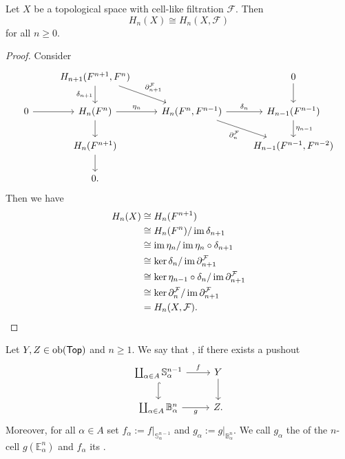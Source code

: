 \begin{theorem}
	Let $X$ be a topological space with cell-like filtration $\mathcal{F}$. Then
	\begin{equation*}
		H_n(X) \cong H_n(X,\mathcal{F})
	\end{equation*}
	\noindent for all $n \geq 0$.
\end{theorem}

\begin{proof}
	Consider
	\begin{equation*}
		\begin{tikzcd}
			& H_{n + 1}(F^{n + 1},F^n)\arrow[d,"\delta_{n + 1}"']\arrow[dr,"\partial^\mathcal{F}_{n + 1}"] & & 0\arrow[d]\\
			0 \arrow[r] & H_n(F^n)\arrow[d] \arrow[r,"\eta_n"] & H_n(F^n,F^{n - 1})\arrow[dr,"\partial^\mathcal{F}_n"'] \arrow[r,"\delta_n"] & H_{n - 1}(F^{n - 1})\arrow[d,"\eta_{n - 1}"]\\
			& H_n(F^{n + 1})\arrow[d] & & H_{n - 1}(F^{n - 1},F^{n - 2})\\
			& 0.
		\end{tikzcd}
	\end{equation*}
	Then we have 
	\begin{align*}
		H_n(X) &\cong H_n(F^{n + 1})\\
		&\cong H_n(F^n)/\operatorname{im} \delta_{n + 1}\\
		&\cong \operatorname{im} \eta_n/\operatorname{im} \eta_n \circ \delta_{n + 1}\\
		&\cong \ker \delta_n/\operatorname{im} \partial^\mathcal{F}_{n + 1}\\
		&\cong \ker \eta_{n - 1}\circ \delta_n/ \operatorname{im} \partial^\mathcal{F}_{n + 1}\\
		&\cong \ker \partial^\mathcal{F}_n/\operatorname{im} \partial^\mathcal{F}_{n + 1}\\
		&= H_n(X,\mathcal{F}).
	\end{align*}
\end{proof}

\begin{definition}
	Let $Y,Z \in \operatorname{ob}(\mathsf{Top})$ and $n \geq 1$. We say that , if there exists a pushout
	\begin{equation*}
		\begin{tikzcd}
			\coprod_{\alpha \in A} \mathbb{S}_\alpha^{n - 1} \arrow[d,hook]\arrow[r,"f"] & Y \arrow[d]\\
			\coprod_{\alpha \in A} \mathbb{B}^n_\alpha \arrow[r,"g"'] & Z.
		\end{tikzcd}
	\end{equation*}
	Moreover, for all $\alpha \in A$ set $f_\alpha := f\vert_{\mathbb{S}^{n - 1}_\alpha}$ and $g_\alpha := g\vert_{\mathbb{B}^n_\alpha}$. We call $g_\alpha$ the  of the $n$-cell $g(\mathbb{E}^n_\alpha)$ and $f_\alpha$ its .
\end{definition}

